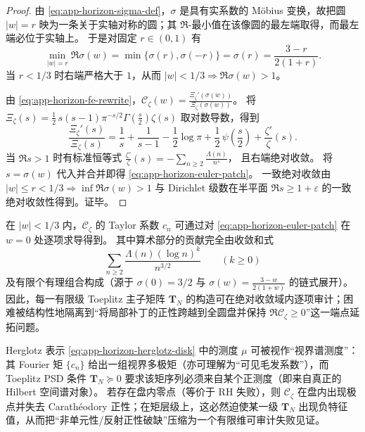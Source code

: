 \begin{proof}
由 \eqref{eq:app-horizon-sigma-def}，\(\sigma\) 是具有实系数的 Möbius 变换，故把圆 \(|w|=r\) 映为一条关于实轴对称的圆；其 \(\Re\)-最小值在该像圆的最左端取得，而最左端必位于实轴上。
于是对固定 \(r\in(0,1)\) 有
\[
\min_{|w|=r}\Re\sigma(w)=\min\{\sigma(r),\sigma(-r)\}=\sigma(r)=\frac{3-r}{2(1+r)}.
\]
当 \(r<1/3\) 时右端严格大于 \(1\)，从而 \(|w|<1/3\Rightarrow \Re\sigma(w)>1\)。
\par
由 \eqref{eq:app-horizon-fe-rewrite}，\(\mathscr{C}_{\zeta}(w)=\frac{\Xi_{\zeta}'(\sigma(w))}{\Xi_{\zeta}(\sigma(w))}\)。
将 \(\Xi_{\zeta}(s)=\frac12\,s(s-1)\pi^{-s/2}\Gamma(\tfrac{s}{2})\zeta(s)\) 取对数导数，得到
\[
\frac{\Xi_{\zeta}'(s)}{\Xi_{\zeta}(s)}
=\frac{1}{s}+\frac{1}{s-1}-\frac12\log\pi+\frac12\,\psi\!\left(\frac{s}{2}\right)+\frac{\zeta'}{\zeta}(s).
\]
当 \(\Re s>1\) 时有标准恒等式
\(
\frac{\zeta'}{\zeta}(s)=-\sum_{n\ge 2}\frac{\Lambda(n)}{n^s}
\)，
且右端绝对收敛。
将 \(s=\sigma(w)\) 代入并合并即得 \eqref{eq:app-horizon-euler-patch}。
一致绝对收敛由 \(|w|\le r<1/3\Rightarrow \inf\Re\sigma(w)>1\) 与 Dirichlet 级数在半平面 \(\Re s\ge 1+\varepsilon\) 的一致绝对收敛性得到。证毕。
\end{proof}

\begin{corollary}\label{cor:app-horizon-prime-moment-interface}
在 \(|w|<1/3\) 内，\(\mathscr{C}_{\zeta}\) 的 Taylor 系数 \(c_n\) 可通过对 \eqref{eq:app-horizon-euler-patch} 在 \(w=0\) 处逐项求导得到。
其中算术部分的贡献完全由收敛和式
\[
\sum_{n\ge2}\frac{\Lambda(n)(\log n)^k}{n^{3/2}}
\qquad(k\ge 0)
\]
及有限个有理组合构成（源于 \(\sigma(0)=3/2\) 与 \(\sigma(w)=\frac{3-w}{2(1+w)}\) 的链式展开）。
因此，每一有限级 Toeplitz 主子矩阵 \(\mathbf{T}_N\) 的构造可在绝对收敛域内逐项审计；困难被结构性地隔离到“将局部补丁的正性跨越到全圆盘并保持 \(\Re\mathscr{C}_{\zeta}\ge 0\)”这一端点延拓问题。
\end{corollary}

\begin{remark}\label{rem:app-horizon-multipole-positivity-hair}
Herglotz 表示 \eqref{eq:app-horizon-herglotz-disk} 中的测度 \(\mu\) 可被视作“视界谱测度”：
其 Fourier 矩 \(\{c_n\}\) 给出一组视界多极矩（亦可理解为“可见毛发系数”），而 Toeplitz PSD 条件 \(\mathbf{T}_N\succeq 0\) 要求该矩序列必须来自某个正测度（即来自真正的 Hilbert 空间谱对象）。
若存在盘内零点（等价于 RH 失败），则 \(\mathscr{C}_{\zeta}\) 在盘内出现极点并失去 Carath\'eodory 正性；在矩层级上，这必然迫使某一级 \(\mathbf{T}_N\) 出现负特征值，从而把“非单元性/反射正性破缺”压缩为一个有限维可审计失败见证。
\end{remark}
